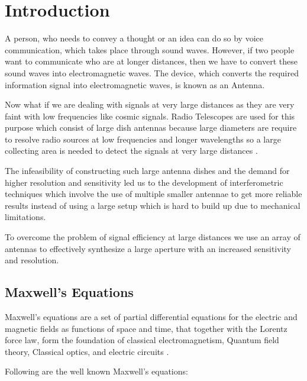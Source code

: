 \chapter{Introduction}

A person, who needs to convey a thought or an idea can do so by voice communication, which takes place through sound waves. However, if two people want to communicate who are at longer distances, then we have to convert these sound waves into electromagnetic waves. The device, which converts the required information signal into electromagnetic waves, is known as an Antenna.

Now what if we are dealing with signals at very large distances as they are very faint with low frequencies like cosmic signals. Radio Telescopes are used for this purpose which consist of large dish antennas because large diameters are require to resolve radio sources at low frequencies and longer wavelengths so a large collecting area is needed to detect the signals at very large distances \cite{christiansen1987radiotelescopes}.

The infeasibility of constructing such large antenna dishes and the demand for higher resolution and sensitivity led us to the development of interferometric techniques which involve the use of multiple smaller antennae to get more reliable results instead of using a large setup which is hard to build up due to mechanical limitations.

To overcome the problem of signal efficiency at large distances we use an array of antennas to effectively synthesize a large aperture with an increased sensitivity and resolution.
 

\section{Maxwell's Equations}

Maxwell’s equations are a set of partial differential equations for the electric and magnetic fields as functions of space and time, that together with the Lorentz force law, form the foundation of classical electromagnetism, Quantum field theory, Classical optics, and electric circuits \cite{griffiths1962introduction}.

Following are the well known Maxwell's equations:

